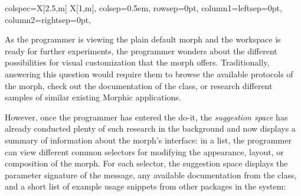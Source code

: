 \begin{center}
\begin{tblr}{
		colspec={X[2.5,m] X[1,m]},
		colsep=0.5em,
		rowsep=0pt,
		column{1}={leftsep=0pt},
		column{2}={rightsep=0pt},
	}
	\end{tblr}
\end{center}

As the programmer is viewing the plain default morph and the workspace is ready for further experiments, the programmer wonders about the different possibilities for visual customization that the morph offers.
Traditionally, answering this question would require them to browse the available protocols of the morph, check out the documentation of the class, or research different samples of similar existing Morphic applications.

However, once the programmer has entered the do-it, the \emph{suggestion space} has already conducted plenty of such research in the background and now displays a summary of information about the morph's interface:
in a list, the programmer can view different common selectors for modifying the appearance, layout, or composition of the morph.
For each selector, the suggestion space displays the parameter signature of the message, any available documentation from the  class, and a short list of example usage snippets from other packages in the system:


